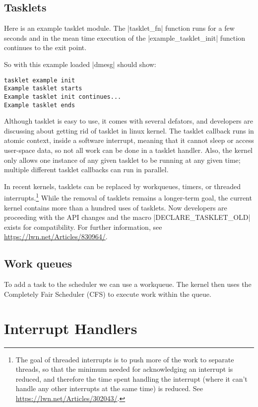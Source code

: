 \documentclass[10pt, oneside]{book}
\begin{document}
\subsection{Tasklets}
\label{sec:tasklet}
Here is an example tasklet module.
The \cpp|tasklet_fn| function runs for a few seconds and in the mean time execution of the \cpp|example_tasklet_init| function continues to the exit point.


So with this example loaded \sh|dmesg| should show:

\begin{verbatim}
tasklet example init
Example tasklet starts
Example tasklet init continues...
Example tasklet ends
\end{verbatim}
Although tasklet is easy to use, it comes with several defators, and developers are discussing about getting rid of tasklet in linux kernel.
The tasklet callback runs in atomic context, inside a software interrupt, meaning that it cannot sleep or access user-space data, so not all work can be done in a tasklet handler.
Also, the kernel only allows one instance of any given tasklet to be running at any given time; multiple different tasklet callbacks can run in parallel.

In recent kernels, tasklets can be replaced by workqueues, timers, or threaded interrupts.\footnote{The goal of threaded interrupts is to push more of the work to separate threads, so that the minimum needed for acknowledging an interrupt is reduced, and therefore the time spent handling the interrupt (where it can't handle any other interrupts at the same time) is reduced.
See \url{https://lwn.net/Articles/302043/}.}
While the removal of tasklets remains a longer-term goal, the current kernel contains more than a hundred uses of tasklets.
Now developers are proceeding with the API changes and the macro \cpp|DECLARE_TASKLET_OLD| exists for compatibility.
For further information, see \url{https://lwn.net/Articles/830964/}.

\subsection{Work queues}
\label{sec:workqueue}
To add a task to the scheduler we can use a workqueue.
The kernel then uses the Completely Fair Scheduler (CFS) to execute work within the queue.


\section{Interrupt Handlers}
\label{sec:interrupt_handler}
\end{document}
